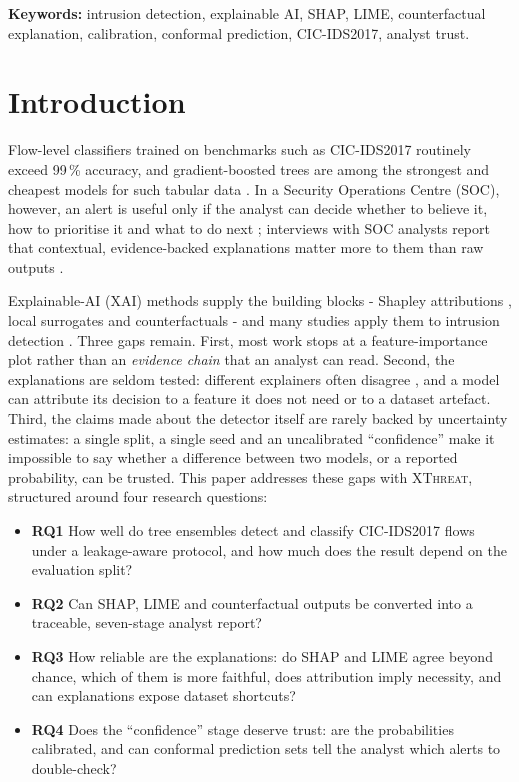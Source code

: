 \documentclass[11pt,a4paper]{article}
\newcommand{\XT}{\textsc{XThreat}}
\begin{document}
\noindent\textbf{Keywords:} intrusion detection, explainable AI, SHAP, LIME, counterfactual explanation, calibration, conformal prediction, CIC-IDS2017, analyst trust.

\section{Introduction}
\label{sec:intro}

Flow-level classifiers trained on benchmarks such as CIC-IDS2017 \parencite{sharafaldin2018} routinely exceed 99\,\% accuracy, and gradient-boosted trees are among the strongest and cheapest models for such tabular data \parencite{chen2016,ke2017,grinsztajn2022}. In a Security Operations Centre (SOC), however, an alert is useful only if the analyst can decide whether to believe it, how to prioritise it and what to do next \parencite{doshivelez2017,lipton2018,miller2019}; interviews with SOC analysts report that contextual, evidence-backed explanations matter more to them than raw outputs \parencite{eriksson2022,rastogi2025}.

Explainable-AI (XAI) methods supply the building blocks - Shapley attributions \parencite{lundberg2017,lundberg2020}, local surrogates \parencite{ribeiro2016} and counterfactuals \parencite{wachter2018} - and many studies apply them to intrusion detection \parencite{wang2020,mane2021,neupane2022}. Three gaps remain. First, most work stops at a feature-importance plot rather than an \emph{evidence chain} that an analyst can read. Second, the explanations are seldom tested: different explainers often disagree \parencite{krishna2024,dietz2024,kumar2025}, and a model can attribute its decision to a feature it does not need or to a dataset artefact. Third, the claims made about the detector itself are rarely backed by uncertainty estimates: a single split, a single seed and an uncalibrated ``confidence'' make it impossible to say whether a difference between two models, or a reported probability, can be trusted. This paper addresses these gaps with \XT{}, structured around four research questions:
\begin{itemize}
  \item \textbf{RQ1} How well do tree ensembles detect and classify CIC-IDS2017 flows under a leakage-aware protocol, and how much does the result depend on the evaluation split?
  \item \textbf{RQ2} Can SHAP, LIME and counterfactual outputs be converted into a traceable, seven-stage analyst report?
  \item \textbf{RQ3} How reliable are the explanations: do SHAP and LIME agree beyond chance, which of them is more faithful, does attribution imply necessity, and can explanations expose dataset shortcuts?
  \item \textbf{RQ4} Does the ``confidence'' stage deserve trust: are the probabilities calibrated, and can conformal prediction sets tell the analyst which alerts to double-check?
\end{itemize}
\end{document}
